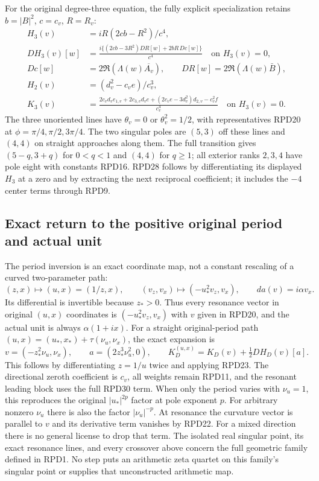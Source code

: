 For the original degree-three equation, the fully explicit
specialization retains $b=|B|^2$, $c=c_v$, $R=R_v$:
\[
 \begin{aligned}
 H_3(v)&=iR(2cb-R^2)/c^4,\\
 DH_3(v)[w]&=\frac{i\{(2cb-3R^2)DR[w]+2bR\,Dc[w]\}}{c^4}
                    \quad\text{on }H_3(v)=0,\\
 Dc[w]&=2\Re(\Lambda(w)\overline{A_v}),\qquad
 DR[w]=2\Re(\Lambda(w)\bar B),\\
 H_2(v)&=(d_v^2-c_ve)/c_v^3,\\
 K_3(v)&=\frac{2c_vd_ve_{1,v}+2c_{3,v}d_ve
               +(2c_ve-3d_v^2)d_{2,v}-c_v^2f}{c_v^4}
                         \quad\text{on }H_3(v)=0.
 \end{aligned}\tag{RPD28}
\]
The three unoriented lines have $\theta_v=0$ or
$\theta_v^2=1/2$, with representatives RPD20 at
$\phi=\pi/4,\pi/2,3\pi/4$.  The two singular poles are $(5,3)$
off these lines and $(4,4)$ on straight approaches along them.
The full transition gives $(5-q,3+q)$ for $0<q<1$ and $(4,4)$
for $q\ge1$; all exterior ranks $2,3,4$ have pole eight with
constants RPD16.  RPD28 follows by differentiating its displayed
$H_3$ at a zero and by extracting the next reciprocal coefficient;
it includes the $-4$ center terms through RPD9.

\subsection{Exact return to the positive original period and actual unit}

The period inversion is an exact coordinate map, not a constant
rescaling of a curved two-parameter path:
\[
 (z,x)\longmapsto(u,x)=(1/z,x),\qquad
 (v_z,v_x)\longmapsto(-u_*^2v_z,v_x),\qquad
 da(v)=i\alpha v_x.\tag{RPD29}
\]
Its differential is invertible because $z_*>0$.
Thus every resonance vector in original $(u,x)$ coordinates is
$(-u_*^2v_z,v_x)$ with $v$ given in RPD20, and the actual unit
is always $\alpha(1+ix)$.
For a straight original-period path
$(u,x)=(u_*,x_*)+\tau(\nu_u,\nu_x)$, the exact expansion is
\[
 v=(-z_*^2\nu_u,\nu_x),\qquad
 a=(2z_*^3\nu_u^2,0),\qquad
 K_D^{(u,x)}=K_D(v)+\tfrac12DH_D(v)[a].\tag{RPD30}
\]
This follows by differentiating $z=1/u$ twice and applying RPD23.
The directional zeroth coefficient is $c_v$, all weights remain
RPD11, and the resonant leading block uses the full RPD30 term.
When only the period varies with $\nu_u=1$, this reproduces the original
$|u_*|^{2p}$ factor at pole exponent $p$.  For arbitrary nonzero
$\nu_u$ there is also the factor $|\nu_u|^{-p}$.
At resonance the curvature
vector is parallel to $v$ and its derivative term vanishes by
RPD22.  For a mixed direction there is no general license to drop
that term.  The isolated real singular point, its exact resonance
lines, and every crossover above concern the full geometric family
defined in RPD1.  No step puts an arithmetic zeta quartet on this
family's singular point or supplies that unconstructed arithmetic map.
